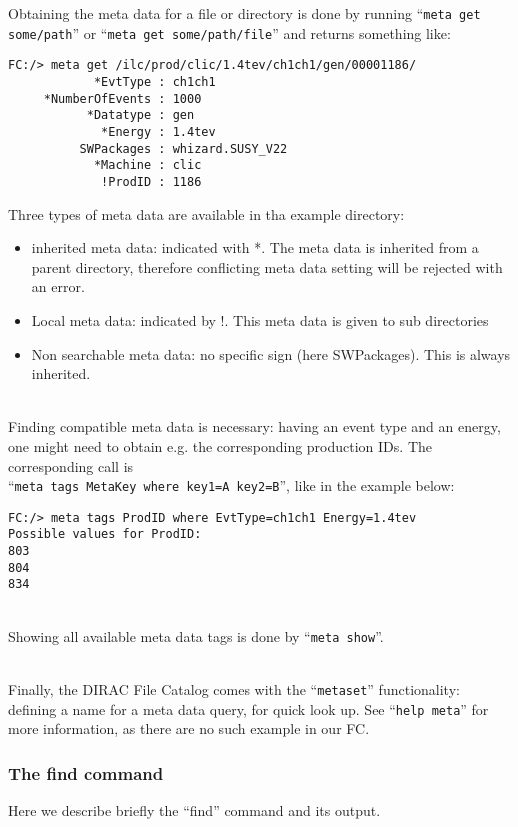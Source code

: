 \documentclass[11pt,a4paper]{scrartcl}
\begin{document}
Obtaining the meta data for a file or directory is done by running
``\lstinline|meta get some/path|'' or ``\lstinline|meta get some/path/file|''
and returns something like:
\begin{lstlisting}
FC:/> meta get /ilc/prod/clic/1.4tev/ch1ch1/gen/00001186/
            *EvtType : ch1ch1
     *NumberOfEvents : 1000
           *Datatype : gen
             *Energy : 1.4tev
          SWPackages : whizard.SUSY_V22
            *Machine : clic
             !ProdID : 1186
\end{lstlisting}
Three types of meta data are available in tha example directory: 
\begin{itemize}
  \item inherited meta data: indicated with *. The meta data is inherited from a
  parent directory, therefore conflicting meta data setting will be rejected
  with an error.
  \item Local meta data: indicated by !. This meta data is given to sub
  directories
  \item Non searchable meta data: no specific sign (here SWPackages). This is
  always inherited. 
\end{itemize}

~\\

Finding compatible meta data is necessary: having an event type and an energy,
one might need to obtain e.g. the corresponding production IDs. The
corresponding call is \\
``\lstinline|meta tags MetaKey where key1=A key2=B|'',
like in the example below:
\begin{lstlisting}
FC:/> meta tags ProdID where EvtType=ch1ch1 Energy=1.4tev
Possible values for ProdID:
803
804
834
\end{lstlisting}

~\\

Showing all available meta data tags is done by ``\lstinline|meta show|''.

~\\

Finally, the DIRAC File Catalog comes with the ``\lstinline|metaset|''
functionality: defining a name for a meta data query, for quick look up.
See ``\lstinline|help meta|'' for more information, as there are no such example
in our FC.

\subsubsection{The find command}\label{sec:find}
Here we describe briefly the ``find'' command and its output. 
\end{document}
